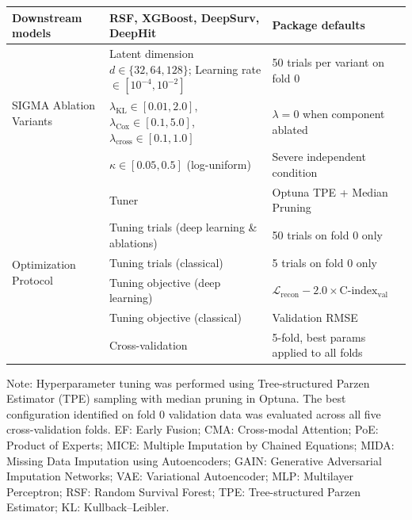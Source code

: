 \documentclass[final,3p,times,authoryear]{elsarticle}
\begin{document}
\begin{table}[!ht]
{\begin{tabular}{lll}
\midrule
Downstream models 
  & RSF, XGBoost, DeepSurv, DeepHit & Package defaults \\
\midrule
\multirow{3}{*}{SIGMA Ablation Variants}
  & Latent dimension $d \in \{32, 64, 128\}$; Learning rate $\in [10^{-4}, 10^{-2}]$ & 50 trials per variant on fold 0 \\
  & $\lambda_{\text{KL}} \in [0.01, 2.0]$, $\lambda_{\text{Cox}} \in [0.1, 5.0]$, $\lambda_{\text{cross}} \in [0.1, 1.0]$ & $\lambda=0$ when component ablated \\
  & $\kappa \in [0.05, 0.5]$ (log-uniform) & Severe independent condition \\
\midrule
\multirow{6}{*}{Optimization Protocol}
  & Tuner & Optuna TPE + Median Pruning \\
  & Tuning trials (deep learning \& ablations) & 50 trials on fold 0 only \\
  & Tuning trials (classical) & 5 trials on fold 0 only \\
  & Tuning objective (deep learning) & $\mathcal{L}_{\text{recon}} - 2.0 \times \text{C-index}_{\text{val}}$ \\
  & Tuning objective (classical) & Validation RMSE \\
  & Cross-validation & 5-fold, best params applied to all folds \\
\bottomrule
\end{tabular}%
}

\vspace{1ex}
\footnotesize{Note: Hyperparameter tuning was performed using Tree-structured Parzen Estimator (TPE) sampling with median pruning in Optuna. The best configuration identified on fold 0 validation data was evaluated across all five cross-validation folds. EF: Early Fusion; CMA: Cross-modal Attention; PoE: Product of Experts; MICE: Multiple Imputation by Chained Equations; MIDA: Missing Data Imputation using Autoencoders; GAIN: Generative Adversarial Imputation Networks; VAE: Variational Autoencoder; MLP: Multilayer Perceptron; RSF: Random Survival Forest; TPE: Tree-structured Parzen Estimator; KL: Kullback--Leibler.}
\end{table}

 

\end{document}
